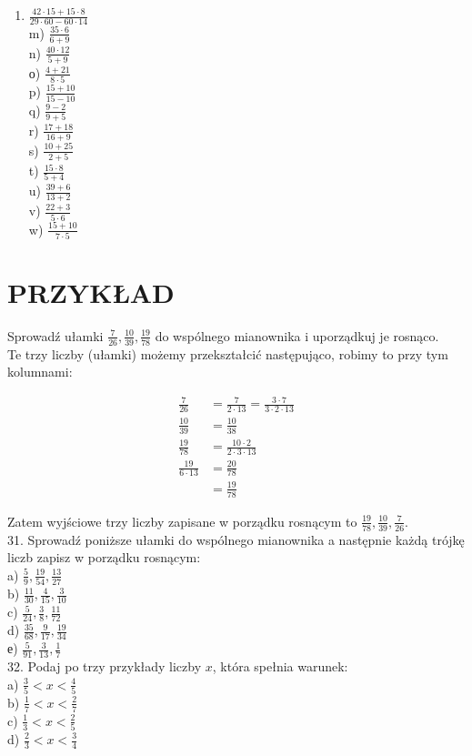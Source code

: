 \documentclass[10pt]{article}
\begin{document}
\begin{enumerate}
  \item \(\frac{42 \cdot 15+15 \cdot 8}{29 \cdot 60-60 \cdot 14}\)\\
m) \(\frac{35 \cdot 6}{6+9}\)\\
n) \(\frac{40 \cdot 12}{5+9}\)\\
о) \(\frac{4+21}{8 \cdot 5}\)\\
p) \(\frac{15+10}{15-10}\)\\
q) \(\frac{9-2}{9+5}\)\\
r) \(\frac{17+18}{16+9}\)\\
s) \(\frac{10+25}{2+5}\)\\
t) \(\frac{15 \cdot 8}{5+4}\)\\
u) \(\frac{39+6}{13+2}\)\\
v) \(\frac{22+3}{5 \cdot 6}\)\\
w) \(\frac{15+10}{7 \cdot 5}\)
\end{enumerate}

\section*{PRZYKŁAD}
Sprowadź ułamki \(\frac{7}{26}, \frac{10}{39}, \frac{19}{78}\) do wspólnego mianownika i uporządkuj je rosnąco.\\
Te trzy liczby (ułamki) możemy przekształcić następująco, robimy to przy tym kolumnami:

\[
\begin{aligned}
\frac{7}{26} & =\frac{7}{2 \cdot 13}=\frac{3 \cdot 7}{3 \cdot 2 \cdot 13} \\
\frac{10}{39} & =\frac{10}{38} \\
\frac{19}{78} & =\frac{10 \cdot 2}{2 \cdot 3 \cdot 13} \\
\frac{19}{6 \cdot 13} & =\frac{20}{78} \\
& =\frac{19}{78}
\end{aligned}
\]

Zatem wyjściowe trzy liczby zapisane w porządku rosnącym to \(\frac{19}{78}, \frac{10}{39}, \frac{7}{26}\).\\
31. Sprowadź poniższe ułamki do wspólnego mianownika a następnie każdą trójkę liczb zapisz w porządku rosnącym:\\
a) \(\frac{5}{9}, \frac{19}{54}, \frac{13}{27}\)\\
b) \(\frac{11}{30}, \frac{4}{15}, \frac{3}{10}\)\\
c) \(\frac{5}{24}, \frac{3}{8}, \frac{11}{72}\)\\
d) \(\frac{35}{68}, \frac{9}{17}, \frac{19}{34}\)\\
е) \(\frac{5}{91}, \frac{3}{13}, \frac{1}{7}\)\\
32. Podaj po trzy przykłady liczby \(x\), która spełnia warunek:\\
a) \(\frac{3}{5}<x<\frac{4}{5}\)\\
b) \(\frac{1}{7}<x<\frac{2}{7}\)\\
c) \(\frac{1}{3}<x<\frac{2}{5}\)\\
d) \(\frac{2}{3}<x<\frac{3}{4}\)
\end{document}
